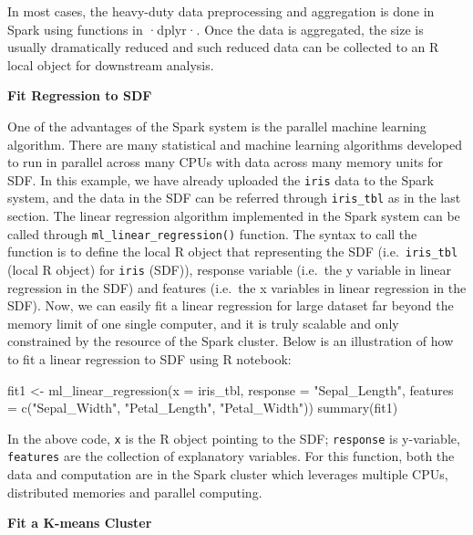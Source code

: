 \documentclass[
  12pt,
]{krantz}
\makeatletter
\newenvironment{Shaded}{\begin{snugshade}}{\end{snugshade}}
\newcommand{\AttributeTok}[1]{\textcolor[rgb]{0.61,0.61,0.61}{#1}}
\newcommand{\FunctionTok}[1]{\textcolor[rgb]{0,0,0}{#1}}
\newcommand{\NormalTok}[1]{#1}
\newcommand{\OtherTok}[1]{\textcolor[rgb]{0.37,0.37,0.37}{#1}}
\newcommand{\StringTok}[1]{\textcolor[rgb]{0.5,0.5,0.5}{#1}}
\newenvironment{kframe}{%
\medskip{}
\setlength{\fboxsep}{.8em}
 \def\at@end@of@kframe{}%
 \ifinner\ifhmode%
  \def\at@end@of@kframe{\end{minipage}}%
  \begin{minipage}{\columnwidth}%
 \fi\fi%
 \def\FrameCommand##1{\hskip\@totalleftmargin \hskip-\fboxsep
 \colorbox{shadecolor}{##1}\hskip-\fboxsep
     \hskip-\linewidth \hskip-\@totalleftmargin \hskip\columnwidth}%
 \MakeFramed {\advance\hsize-\width
   \@totalleftmargin\z@ \linewidth\hsize
   \@setminipage}}%
 {\par\unskip\endMakeFramed%
 \at@end@of@kframe}
\renewenvironment{Shaded}{\begin{kframe}}{\end{kframe}}
\makeatother
\begin{document}
In most cases, the heavy-duty data preprocessing and aggregation is done in Spark using functions in ·dplyr·. Once the data is aggregated, the size is usually dramatically reduced and such reduced data can be collected to an R local object for downstream analysis.

\textbf{Fit Regression to SDF}

One of the advantages of the Spark system is the parallel machine learning algorithm. There are many statistical and machine learning algorithms developed to run in parallel across many CPUs with data across many memory units for SDF. In this example, we have already uploaded the \texttt{iris} data to the Spark system, and the data in the SDF can be referred through \texttt{iris\_tbl} as in the last section. The linear regression algorithm implemented in the Spark system can be called through \texttt{ml\_linear\_regression()} function. The syntax to call the function is to define the local R object that representing the SDF (i.e.~\texttt{iris\_tbl} (local R object) for \texttt{iris} (SDF)), response variable (i.e.~the y variable in linear regression in the SDF) and features (i.e.~the x variables in linear regression in the SDF). Now, we can easily fit a linear regression for large dataset far beyond the memory limit of one single computer, and it is truly scalable and only constrained by the resource of the Spark cluster. Below is an illustration of how to fit a linear regression to SDF using R notebook:

\begin{Shaded}
\begin{Highlighting}[]
\NormalTok{fit1 }\OtherTok{\textless{}{-}} \FunctionTok{ml\_linear\_regression}\NormalTok{(}\AttributeTok{x =}\NormalTok{ iris\_tbl, }\AttributeTok{response =} \StringTok{"Sepal\_Length"}\NormalTok{,}
        \AttributeTok{features =} \FunctionTok{c}\NormalTok{(}\StringTok{"Sepal\_Width"}\NormalTok{, }\StringTok{"Petal\_Length"}\NormalTok{, }\StringTok{"Petal\_Width"}\NormalTok{))}
\FunctionTok{summary}\NormalTok{(fit1)}
\end{Highlighting}
\end{Shaded}

In the above code, \texttt{x} is the R object pointing to the SDF; \texttt{response} is y-variable, \texttt{features} are the collection of explanatory variables. For this function, both the data and computation are in the Spark cluster which leverages multiple CPUs, distributed memories and parallel computing.

\textbf{Fit a K-means Cluster}
\end{document}

